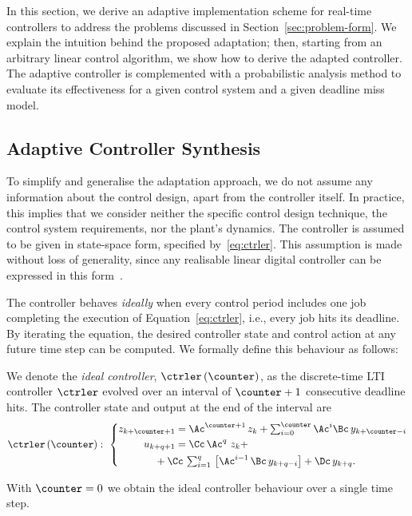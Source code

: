 In this section, we derive an adaptive implementation scheme for real-time controllers to address the problems discussed in Section~\ref{sec:problem-form}.
We explain the intuition behind the proposed adaptation; then, starting from an arbitrary linear control algorithm, we show how to derive the adapted controller.
The adaptive controller is complemented with a probabilistic analysis method to evaluate its effectiveness for a given control system and a given deadline miss model.

\subsection{Adaptive Controller Synthesis}%
\label{sec:adaptation}%
%
To simplify and generalise the adaptation approach, we do not assume any information about the control design, apart from the controller itself. 
In practice, this implies that we consider neither the specific control design technique, the control system requirements, nor the plant's dynamics.
The controller is assumed to be given in state-space form, specified by~\eqref{eq:ctrler}.
This assumption is made without loss of generality, since any realisable linear digital controller can be expressed in this form~\cite{Astrom:2008}.

The controller behaves \emph{ideally} when every control period includes one job completing the execution of Equation~\eqref{eq:ctrler}, i.e., every job hits its deadline.
By iterating the equation, the desired controller state and control action at any future time step can be computed. 
We formally define this behaviour as follows:

\begin{definition}%
    We denote the \emph{ideal controller}, $\ctrler\funof{\counter}$, as the discrete-time LTI controller $\ctrler$ evolved over an interval of $\counter+1$ consecutive deadline hits.
    The controller state and output at the end of the interval are
    \begin{equation}
        \label{eq:ctrler-ideal}
        \ctrler\funof{\counter}:\,\, 
        \left\{\begin{aligned}
            z_{k+\counter+1} &= \Ac^{\counter+1}\,z_{k} + \textstyle\sum_{i=0}^{\counter} \Ac^i \Bc \,y_{k+\counter-i}\\
            u_{k+q+1} &= \Cc\, \Ac^{q}\,\,z_k + \\
                       &\hspace{-2em}+ \Cc\, \textstyle\sum\nolimits_{i=1}^{q}\, \left[ \Ac^{i-1}\, \Bc\, y_{k+q-i}\right] 
                       + \Dc\, y_{k+q}.
        \end{aligned}\right.
    \end{equation}
\end{definition}
With $\counter=0$ we obtain the ideal controller behaviour over a single time step.


